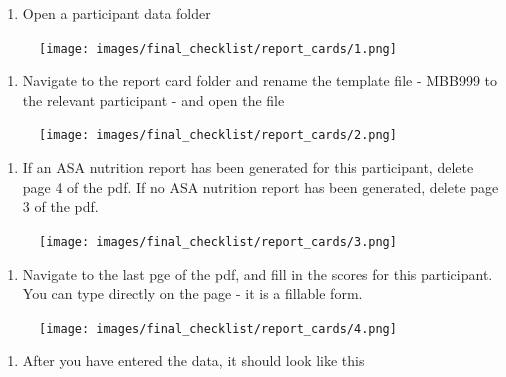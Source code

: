 \documentclass[
]{book}
\providecommand{\tightlist}{%
  \setlength{\itemsep}{0pt}\setlength{\parskip}{0pt}}
\begin{document}
\begin{enumerate}
\def\labelenumi{\arabic{enumi}.}
\tightlist
\item
  Open a participant data folder
\end{enumerate}

\begin{figure}
\centering
\texttt{[image: images/final\_checklist/report\_cards/1.png]}
\caption{}
\end{figure}

\begin{enumerate}
\def\labelenumi{\arabic{enumi}.}
\setcounter{enumi}{1}
\tightlist
\item
  Navigate to the report card folder and rename the template file - MBB999 to the relevant participant - and open the file
\end{enumerate}

\begin{figure}
\centering
\texttt{[image: images/final\_checklist/report\_cards/2.png]}
\caption{}
\end{figure}

\begin{enumerate}
\def\labelenumi{\arabic{enumi}.}
\setcounter{enumi}{2}
\tightlist
\item
  If an ASA nutrition report has been generated for this participant, delete page 4 of the pdf. If no ASA nutrition report has been generated, delete page 3 of the pdf.
\end{enumerate}

\begin{figure}
\centering
\texttt{[image: images/final\_checklist/report\_cards/3.png]}
\caption{}
\end{figure}

\begin{enumerate}
\def\labelenumi{\arabic{enumi}.}
\setcounter{enumi}{3}
\tightlist
\item
  Navigate to the last pge of the pdf, and fill in the scores for this participant. You can type directly on the page - it is a fillable form.
\end{enumerate}

\begin{figure}
\centering
\texttt{[image: images/final\_checklist/report\_cards/4.png]}
\caption{}
\end{figure}

\begin{enumerate}
\def\labelenumi{\arabic{enumi}.}
\setcounter{enumi}{4}
\tightlist
\item
  After you have entered the data, it should look like this
\end{enumerate}
\end{document}
